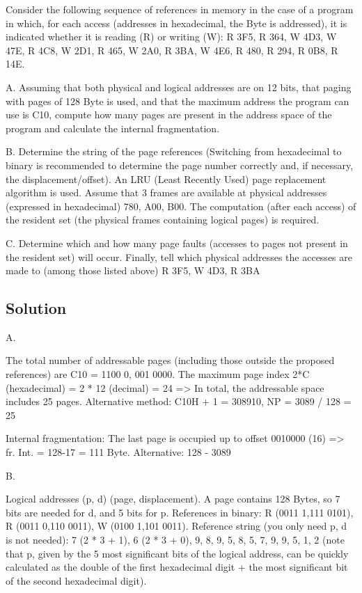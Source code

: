Consider the following sequence of references in memory in the case of a program in which, for each access (addresses in hexadecimal, the Byte is addressed), it is indicated whether it is reading (R) or writing (W): R 3F5, R 364, W 4D3, W 47E, R 4C8, W 2D1, R 465, W 2A0, R 3BA, W 4E6, R 480, R 294, R 0B8, R 14E.

A. Assuming that both physical and logical addresses are on 12 bits, that paging with pages of 128 Byte is used, and that the maximum address the program can use is C10, compute how many pages are present in the address space of the program and calculate the internal fragmentation.

B. Determine the string of the page references (Switching from hexadecimal to binary is recommended to determine the page number correctly and, if necessary, the displacement/offset). An LRU (Least Recently Used) page replacement algorithm is used. Assume that 3 frames are available at physical addresses (expressed in hexadecimal) 780, A00, B00. The computation (after each access) of the resident set (the physical frames containing logical pages) is required.

C. Determine which and how many page faults (accesses to pages not present in the resident set) will occur.
Finally, tell which physical addresses the accesses are made to (among those listed above) R 3F5, W 4D3, R 3BA

\subsection{Solution}

A.

The total number of addressable pages (including those outside the proposed references) are C10 = 1100 0, 001 0000. The maximum page index 2*C (hexadecimal) = 2 * 12 (decimal) = 24 => In total, the addressable space includes 25 pages. Alternative method: C10H + 1 = 308910, NP = 3089 / 128 = 25

Internal fragmentation: The last page is occupied up to offset 0010000 (16) => fr. Int. = 128-17 = 111 Byte. Alternative: 128 - 3089%

B.

Logical addresses (p, d) (page, displacement). A page contains 128 Bytes, so 7 bits are needed for d, and 5 bits for p. References in binary: R (0011 1,111 0101), R (0011 0,110 0011), W (0100 1,101 0011). Reference string (you only need p, d is not needed): 7 (2 * 3 + 1), 6 (2 * 3 + 0), 9, 8, 9, 5, 8, 5, 7, 9, 9, 5, 1, 2 (note that p, given by the 5 most significant bits of the logical address, can be quickly calculated as the double of the first hexadecimal digit + the most significant bit of the second hexadecimal digit).

